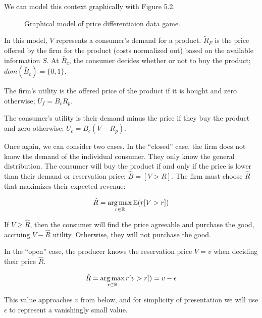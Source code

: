 \documentclass[../thesis.tex]{subfiles}
\begin{document}
We can model this context graphically with
Figure 5.2.

\begin{figure}
  \label{fig:price-diff}
\begin{center}
\end{center}
\caption{Graphical model of price differentiaion data game.}
\end{figure}

In this model, $V$ represents a consumer's demand for a product.
$\tilde{R}_F$ is the price offered by the firm for the product
(costs normalized out) based on the available information $S$.
At $\tilde{B_c}$, the consumer decides whether or not to buy
the product; $dom(\tilde{B_c}) = \{0,1\}$.

The firm's utility is the offered price of the product if
it is bought and zero otherwise; $U_f = B_c R_p$.

The consumer's utility is their demand minus the price if
they buy the product and zero otherwise; $U_c = B_c (V - R_p)$.

Once again, we can consider two cases.
In the ``closed'' case,
the firm does not know the demand of the individual
consumer.
They only know the general distribution.
The consumer will buy the product if and only if
the price is lower than their demand or reservation price;
$\hat{B} = [V > R]$.
The firm must choose $\hat{R}$ that maximizes their expected
revenue:

$$\hat{R} = \operatorname*{arg\,max}_{r \in \mathbb{R}} \mathbb{E}(r [V > r])$$

If $V \geq \hat{R}$, then the consumer will find the
price agreeable and purchase the good, accruing $V - \hat{R}$
utility.
Otherwise, they will not purchase the good.

In the ``open'' case, the producer knows the reservation price
$V = v$ when deciding their price $\hat{R}$.

$$\hat{R} = \operatorname*{arg\,max}_{r \in \mathbb{R}} r [v > r]) = v - \epsilon$$

This value approaches $v$ from below, and for simplicity of
presentation we will use $\epsilon$ to represent a vanishingly
small value.
\end{document}
